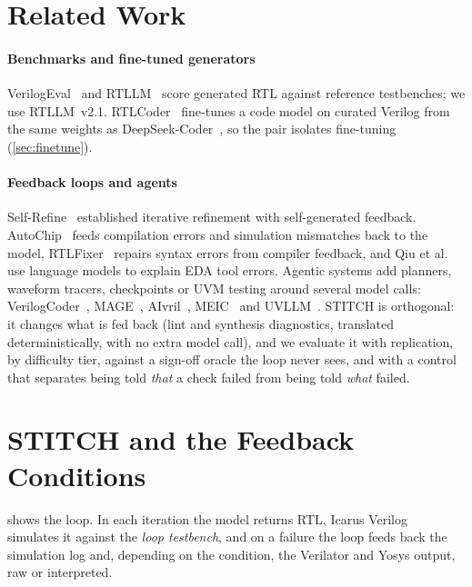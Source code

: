 \documentclass[11pt]{article}
\begin{document}
\section{Related Work}
\label{sec:related}

\paragraph{Benchmarks and fine-tuned generators} VerilogEval~\cite{verilogeval}
and RTLLM~\cite{lu2024rtllm} score generated RTL against reference testbenches;
we use RTLLM~v2.1. RTLCoder~\cite{rtlcoder} fine-tunes a code model on curated
Verilog from the same weights as DeepSeek-Coder~\cite{deepseekcoder}, so the
pair isolates fine-tuning (\cref{sec:finetune}).

\paragraph{Feedback loops and agents} Self-Refine~\cite{selfrefine} established
iterative refinement with self-generated feedback. AutoChip~\cite{autochip}
feeds compilation errors and simulation mismatches back to the model,
RTLFixer~\cite{rtlfixer} repairs syntax errors from compiler feedback, and Qiu
et al.~\cite{qiu2024} use language models to explain EDA tool errors. Agentic
systems add planners, waveform tracers, checkpoints or UVM testing around
several model calls: VerilogCoder~\cite{verilogcoder}, MAGE~\cite{mage},
AIvril~\cite{aivril}, MEIC~\cite{meic} and UVLLM~\cite{uvllm}. STITCH is
orthogonal: it changes what is fed back (lint and synthesis diagnostics,
translated deterministically, with no extra model call), and we evaluate it
with replication, by difficulty tier, against a sign-off oracle the loop never
sees, and with a control that separates being told \emph{that} a check failed
from being told \emph{what} failed.

\section{STITCH and the Feedback Conditions}
\label{sec:stitch}

 shows the loop. In each iteration the model returns RTL,
Icarus Verilog~\cite{iverilog} simulates it against the \emph{loop testbench},
and on a failure the loop feeds back the simulation log and, depending on the
condition, the Verilator and Yosys output, raw or interpreted.
\end{document}
